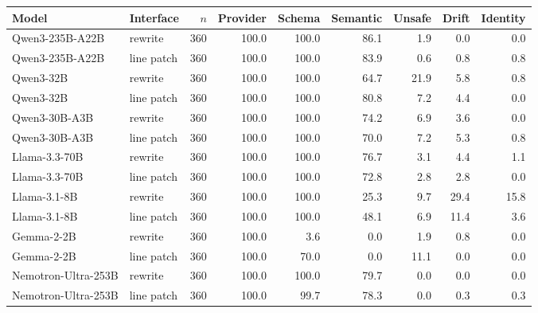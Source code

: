 \begin{tabular}{llrrrrrrr}
\toprule
Model & Interface & $n$ & Provider & Schema & Semantic & Unsafe & Drift & Identity \\
\midrule
Qwen3-235B-A22B & rewrite & 360 & 100.0 & 100.0 & 86.1 & 1.9 & 0.0 & 0.0 \\
Qwen3-235B-A22B & line patch & 360 & 100.0 & 100.0 & 83.9 & 0.6 & 0.8 & 0.8 \\
Qwen3-32B & rewrite & 360 & 100.0 & 100.0 & 64.7 & 21.9 & 5.8 & 0.8 \\
Qwen3-32B & line patch & 360 & 100.0 & 100.0 & 80.8 & 7.2 & 4.4 & 0.0 \\
Qwen3-30B-A3B & rewrite & 360 & 100.0 & 100.0 & 74.2 & 6.9 & 3.6 & 0.0 \\
Qwen3-30B-A3B & line patch & 360 & 100.0 & 100.0 & 70.0 & 7.2 & 5.3 & 0.8 \\
Llama-3.3-70B & rewrite & 360 & 100.0 & 100.0 & 76.7 & 3.1 & 4.4 & 1.1 \\
Llama-3.3-70B & line patch & 360 & 100.0 & 100.0 & 72.8 & 2.8 & 2.8 & 0.0 \\
Llama-3.1-8B & rewrite & 360 & 100.0 & 100.0 & 25.3 & 9.7 & 29.4 & 15.8 \\
Llama-3.1-8B & line patch & 360 & 100.0 & 100.0 & 48.1 & 6.9 & 11.4 & 3.6 \\
Gemma-2-2B & rewrite & 360 & 100.0 & 3.6 & 0.0 & 1.9 & 0.8 & 0.0 \\
Gemma-2-2B & line patch & 360 & 100.0 & 70.0 & 0.0 & 11.1 & 0.0 & 0.0 \\
Nemotron-Ultra-253B & rewrite & 360 & 100.0 & 100.0 & 79.7 & 0.0 & 0.0 & 0.0 \\
Nemotron-Ultra-253B & line patch & 360 & 100.0 & 99.7 & 78.3 & 0.0 & 0.3 & 0.3 \\
\bottomrule
\end{tabular}
